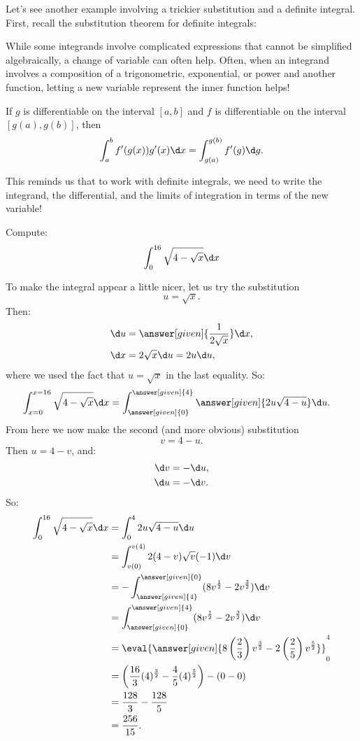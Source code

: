 \documentclass[nooutcomes]{ximera}
\begin{document}
Let's see another example involving a trickier substitution and a definite integral.  First, recall the substitution theorem for definite integrals:

While some integrands involve complicated expressions that cannot be simplified algebraically, a change of variable can often help. Often, when an integrand involves a composition of a trigonometric, exponential, or power and another function, letting a new variable represent the inner function helps!

\begin{theorem} 
If $g$ is differentiable on the interval $[a,b]$ and $f$ is
differentiable on the interval $[g(a),g(b)]$, then
\[
\int_a^b f'(g(x)) g'(x) \d x =\int_{g(a)}^{g(b)} f'(g) \d g.
\]
\end{theorem}

This reminds us that to work with definite integrals, we need to write the integrand, the differential, and the limits of integration in terms of the new variable!

\begin{example}
Compute:
\[
\int_0^{16} \sqrt{4 - \sqrt{x}} \d x
\]
\begin{explanation}
To make the integral appear a little nicer, let us try the substitution
\[
u = \sqrt{x}.
\]
Then:
\begin{align*}
\d u &= \answer[given]{\frac{1}{2 \sqrt{x}}} \d x,\\
\d x &= 2 \sqrt{x} \d u = 2u \d u,
\end{align*}
where we used the fact that $u=\sqrt{x}$ in the last equality.  So:
\begin{align*}
\int_{x=0}^{x=16} \sqrt{4 - \sqrt{x}} \d x &=  \int_{\answer[given]{0}}^{\answer[given]{4}} \answer[given]{2u \sqrt{4-u}} \d u.
\end{align*}
From here we now make the second (and more obvious) substitution
\[
v = 4-u.
\]
Then $u = 4-v$, and: 
\begin{align*}
\d v &= - \d u,\\
\d u &= - \d v.
\end{align*}
So:
\begin{align*}
\int_0^{16} \sqrt{4 - \sqrt{x}} \d x &= \int_0^4 2u \sqrt{4-u} \d u  \\
&= \int_{v(0)}^{v(4)} 2 (4-v) \sqrt{v} (-1) \d v  \\
&= - \int_{\answer[given]{4}}^{\answer[given]{0}} ( 8v^{\frac{1}{2}} - 2v^{\frac{3}{2}} ) \d v  \\
&= \int_{\answer[given]{0}}^{\answer[given]{4}} ( 8v^{\frac{1}{2}} - 2v^{\frac{3}{2}} ) \d v  \\
&= \eval{ \answer[given]{8 \left( \frac{2}{3} \right) v^{\frac{3}{2}} - 2 \left( \frac{2}{5} \right) v^{\frac{5}{2}}} }_{0}^{4}  \\
&= \left( \frac{16}{3} (4)^{\frac{3}{2}} - \frac{4}{5} (4)^{\frac{5}{2}} \right) - \left( 0 - 0 \right)  \\
&= \frac{128}{3} - \frac{128}{5}   \\
&= \frac{256}{15}.
\end{align*}
\end{explanation}
\end{example}
\end{document}
